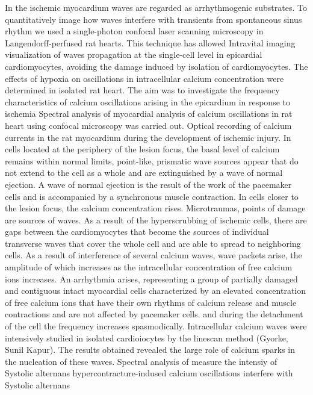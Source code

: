 \documentclass{biophys-new}
\begin{document}
In the ischemic myocardium  waves are regarded as arrhythmogenic substrates.
To quantitatively image how  waves interfere with  transients from spontaneous sinus rhythm we used a single-photon confocal laser scanning microscopy in Langendorff-perfused rat hearts.
This technique has allowed Intravital imaging visualization of  waves propagation at the single-cell level in epicardial cardiomyocytes, avoiding the damage induced by isolation of cardiomyocytes.
The effects of hypoxia on oscillations in intracellular calcium concentration  were determined in isolated rat heart.
The aim was to investigate the frequency characteristics of calcium oscillations arising in the epicardium in response to ischemia
Spectral  analysis of myocardial analysis of calcium oscillations in rat heart using confocal microscopy was carried out.
Optical recording of calcium currents in the rat myocardium during the development of ischemic injury.
In cells located at the periphery of the lesion focus, the basal level of calcium remains within normal limits, point-like, prismatic wave sources appear that do not extend to the cell as a whole and are extinguished by a wave of normal ejection.
A wave of normal ejection is the result of the work of the pacemaker cells and is accompanied by a synchronous muscle contraction.
In cells closer to the lesion focus, the calcium concentration rises.
Microtraumas, points of damage are sources of waves.
As a result of the hyperscrubbing of ischemic cells, there are gaps between the cardiomyocytes that become the sources of individual transverse waves that cover the whole cell and are able to spread to neighboring cells.
As a result of interference of several calcium waves, wave packets arise, the amplitude of which increases as the intracellular concentration of free calcium ions increases.
An arrhythmia arises, representing a group of partially damaged and contiguous intact myocardial cells characterized by an elevated concentration of free calcium ions that have their own rhythms of calcium release and muscle contractions and are not affected by pacemaker cells.
and during the detachment of the cell the frequency increases spasmodically.
Intracellular calcium waves were intensively studied in isolated cardioiocytes by the linescan method (Gyorke, Sunil Kapur).
The results obtained revealed the large role of calcium sparks in the nucleation of these waves.
Spectral analysis of
 measure the intensiy of Systolic  alternans
hypercontracture-indused calcium oscillations interfere with Systolic  alternans
\end{document}
